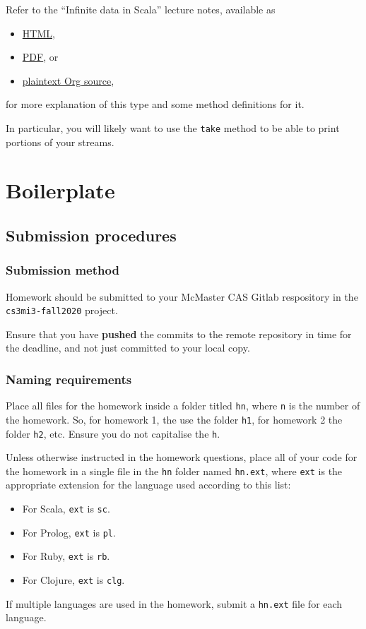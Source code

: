 \documentclass[11pt]{article}
\begin{document}
Refer to the “Infinite data in Scala” lecture notes, available as
\begin{itemize}
\item \href{./../notes/live-coding/10-02-infinite-data-in-scala.html}{HTML},
\item \href{./../notes/live-coding/10-02-infinite-data-in-scala.pdf}{PDF}, or
\item \href{./../notes/live-coding/10-02-infinite-data-in-scala.org}{plaintext Org source},
\end{itemize}
for more explanation of this type
and some method definitions for it.

In particular, you will likely want to use the \texttt{take} method
to be able to print portions of your streams.

\section*{Boilerplate}
\label{sec:org72f60a9}
\subsection*{Submission procedures}
\label{sec:orgd8d5f83}
\subsubsection*{Submission method}
\label{sec:orgdc217a5}

Homework should be submitted to your McMaster CAS Gitlab respository
in the \texttt{cs3mi3-fall2020} project.

Ensure that you have \textbf{pushed} the commits to the remote repository
in time for the deadline, and not just committed to your local copy.

\subsubsection*{Naming requirements}
\label{sec:org8c943e0}

Place all files for the homework
inside a folder titled \texttt{hn}, where \texttt{n} is the number of the homework.
So, for homework 1, the use the folder \texttt{h1}, for homework 2 the folder \texttt{h2}, etc.
Ensure you do not capitalise the \texttt{h}.

Unless otherwise instructed in the homework questions,
place all of your code for the homework
in a single file in the \texttt{hn} folder named \texttt{hn.ext},
where \texttt{ext} is the appropriate extension for the language used
according to this list:
\begin{itemize}
\item For Scala, \texttt{ext} is \texttt{sc}.
\item For Prolog, \texttt{ext} is \texttt{pl}.
\item For Ruby, \texttt{ext} is \texttt{rb}.
\item For Clojure, \texttt{ext} is \texttt{clg}.
\end{itemize}
If multiple languages are used in the homework,
submit a \texttt{hn.ext} file for each language.
\end{document}
